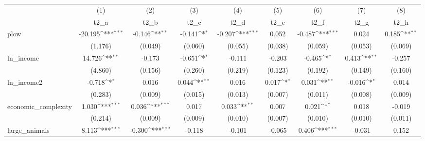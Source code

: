 {
\def\sym#1{\ifmmode^{#1}\else\(^{#1}\)\fi}
\begin{tabular}{l*{8}{c}}
\hline\hline
            &\multicolumn{1}{c}{(1)}&\multicolumn{1}{c}{(2)}&\multicolumn{1}{c}{(3)}&\multicolumn{1}{c}{(4)}&\multicolumn{1}{c}{(5)}&\multicolumn{1}{c}{(6)}&\multicolumn{1}{c}{(7)}&\multicolumn{1}{c}{(8)}\\
            &\multicolumn{1}{c}{t2\_a}&\multicolumn{1}{c}{t2\_b}&\multicolumn{1}{c}{t2\_c}&\multicolumn{1}{c}{t2\_d}&\multicolumn{1}{c}{t2\_e}&\multicolumn{1}{c}{t2\_f}&\multicolumn{1}{c}{t2\_g}&\multicolumn{1}{c}{t2\_h}\\
\hline
plow        &     -20.195\sym{***}&      -0.146\sym{**} &      -0.141\sym{*}  &      -0.207\sym{***}&       0.052         &      -0.487\sym{***}&       0.024         &       0.185\sym{**} \\
            &     (1.176)         &     (0.049)         &     (0.060)         &     (0.055)         &     (0.038)         &     (0.059)         &     (0.053)         &     (0.069)         \\
[1em]
ln\_income   &      14.726\sym{**} &      -0.173         &      -0.651\sym{*}  &      -0.111         &      -0.203         &      -0.465\sym{*}  &       0.413\sym{**} &      -0.257         \\
            &     (4.860)         &     (0.156)         &     (0.260)         &     (0.219)         &     (0.123)         &     (0.192)         &     (0.149)         &     (0.160)         \\
[1em]
ln\_income2  &      -0.718\sym{*}  &       0.016         &       0.044\sym{**} &       0.016         &       0.017\sym{*}  &       0.031\sym{**} &      -0.016\sym{*}  &       0.014         \\
            &     (0.283)         &     (0.009)         &     (0.015)         &     (0.013)         &     (0.007)         &     (0.011)         &     (0.008)         &     (0.009)         \\
[1em]
economic\_complexity&       1.030\sym{***}&       0.036\sym{***}&       0.017         &       0.033\sym{**} &       0.007         &       0.021\sym{*}  &       0.018         &      -0.019         \\
            &     (0.214)         &     (0.009)         &     (0.009)         &     (0.010)         &     (0.007)         &     (0.010)         &     (0.010)         &     (0.011)         \\
[1em]
large\_animals&       8.113\sym{***}&      -0.300\sym{***}&      -0.118         &      -0.101         &      -0.065         &       0.406\sym{***}&      -0.031         &       0.152         \\

\end{tabular}}
